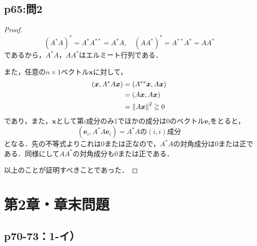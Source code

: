 \documentclass[uplatex,dvipdfmx,a4paper,11pt,fleqn]{jsarticle}
\begin{document}
    \subsection*{p65:問2}

\begin{tleftbar}
    \begin{proof}
    \[
        (A^\ast A)^{\ast} = A^{\ast} A^{\ast \ast} = A^{\ast} A, \quad (A A^{\ast})^\ast = A^{\ast \ast} A^\ast =A A^{\ast}
    \]
    であるから，$A^\ast A$，$A A^{\ast}$はエルミート行列である．

    また，任意の$n \times 1$ベクトル$\bm{x}$に対して，
    \begin{align*} 
        (\bm{x}, A^{\ast}A \bm{x}) & = (A^{\ast \ast} \bm{x}, A \bm{x}) \\
        & = (A \bm{x}, A \bm{x}) \\
        & = \norm{A \bm{x}}^2 \geqq 0
    \end{align*}
    であり，また，$\bm{x}$として第$i$成分のみ1でほかの成分は$0$のベクトル$\bm{e}_i$をとると，
    \[
        (\bm{e}_i, A^{\ast}A \bm{e}_i) = \text{$A^{\ast}A$の$(i,i)$成分}
    \]
    となる．先の不等式よりこれは$0$または正なので，$A^{\ast}A$の対角成分は$0$または正である．同様にして$AA^{\ast}$の対角成分も$0$または正である．

    以上のことが証明すべきことであった．
\end{proof}
\end{tleftbar}

    \newpage 
\section*{第2章・章末問題}


\subsection*{p70-73：1-イ）}
\end{document}
